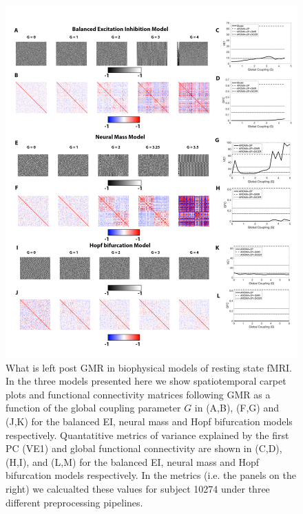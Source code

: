 \documentclass[oneside]{zHenriquesLab-StyleBioRxiv}
\begin{document}
\begin{figure}[ht!]
\includegraphics[width=1\textwidth]{figs/GMRModels.png}
\caption{What is left post GMR in biophysical models of resting state fMRI. In the three models presented here we show spatiotemporal carpet plots and functional connectivity matrices following GMR as a function of the global coupling parameter $G$ in (A,B), (F,G) and (J,K) for the balanced EI, neural mass and Hopf bifurcation models respectively. Quantatitive metrics of variance explained by the first PC (VE1) and global functional connectivity are shown in (C,D), (H,I), and (L,M) for the balanced EI, neural mass and Hopf bifurcation models respectively. In the metrics (i.e. the panels on the right) we calcualted these values for subject 10274 under three different preprocessing pipelines.}\label{fig:GMRModels}
\end{figure}
\end{document}
